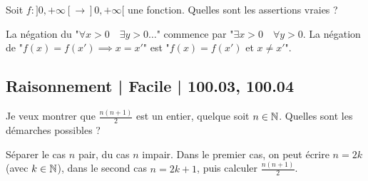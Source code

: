 \begin{question}
Soit $f : ]0,+\infty[ \to ]0,+\infty[$ une fonction.
Quelles sont les assertions vraies ?
\begin{answers}
    
    

\end{answers}
\begin{explanations}
La négation du "$\forall x > 0 \quad \exists y > 0 \ldots$" commence par "$\exists x > 0 \quad \forall y > 0$.
La négation de "$f(x) = f(x') \implies x = x'$" est "$f(x) = f(x')$ et $x \neq x'$".
\end{explanations}
\end{question}



\subsection{Raisonnement | Facile | 100.03, 100.04}


\begin{question}
Je veux montrer que $\frac{n(n+1)}{2}$ est un entier, quelque soit $n\in\mathbb{N}$.  Quelles sont les démarches possibles ?
\begin{answers}    
    


\end{answers}
\begin{explanations}
Séparer le cas $n$ pair, du cas $n$ impair. Dans le premier cas, on peut écrire $n=2k$ (avec $k\in \mathbb{N}$), dans le second cas $n=2k+1$, puis calculer $\frac{n(n+1)}{2}$. 
\end{explanations}
\end{question}


